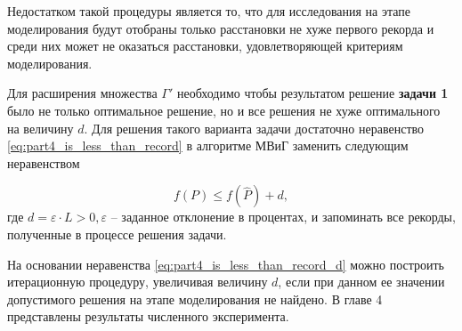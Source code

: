Недостатком такой процедуры является то, что для исследования на этапе моделирования будут отобраны только расстановки не хуже первого рекорда и среди них может не оказаться расстановки, удовлетворяющей критериям моделирования.

Для расширения множества $\Gamma'$ необходимо чтобы результатом решение \textbf{задачи 1} было не только оптимальное решение, но и все решения не хуже оптимального на величину $d$. Для решения такого варианта задачи достаточно неравенство \cref{eq:part4_is_less_than_record} в алгоритме МВиГ заменить следующим неравенством 

\begin{equation}
    \label{eq:part4_is_less_than_record_d}
    f(P) \leqslant f(\widehat{P}) + d,
\end{equation}
где $d = \varepsilon \cdot L > 0, \varepsilon$ -- заданное отклонение в процентах, и запоминать все рекорды, полученные в процессе решения задачи.

На основании неравенства \cref{eq:part4_is_less_than_record_d} можно построить итерационную процедуру, увеличивая величину $d$, если при данном ее значении допустимого решения на этапе моделирования не найдено. В главе 4 представлены результаты численного эксперимента.





